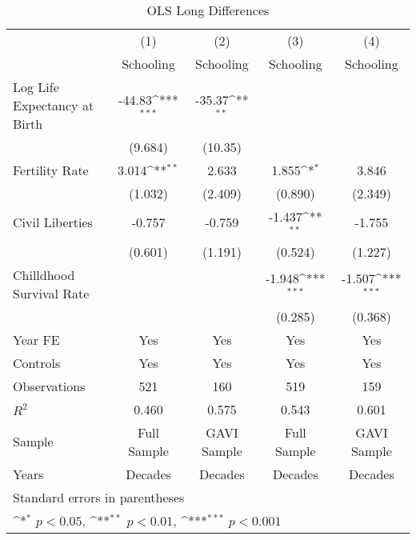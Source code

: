 \begin{table}[htbp]\centering
\def\sym#1{\ifmmode^{#1}\else\(^{#1}\)\fi}
\caption{OLS Long Differences}
\begin{tabular}{l*{4}{c}}
\toprule
                &\multicolumn{1}{c}{(1)}&\multicolumn{1}{c}{(2)}&\multicolumn{1}{c}{(3)}&\multicolumn{1}{c}{(4)}\\
                &\multicolumn{1}{c}{Schooling}&\multicolumn{1}{c}{Schooling}&\multicolumn{1}{c}{Schooling}&\multicolumn{1}{c}{Schooling}\\
\midrule
Log Life Expectancy at Birth&   -44.83\sym{***}&   -35.37\sym{**} &                  &                  \\
                &  (9.684)         &  (10.35)         &                  &                  \\
\addlinespace
Fertility Rate  &    3.014\sym{**} &    2.633         &    1.855\sym{*}  &    3.846         \\
                &  (1.032)         &  (2.409)         &  (0.890)         &  (2.349)         \\
\addlinespace
Civil Liberties &   -0.757         &   -0.759         &   -1.437\sym{**} &   -1.755         \\
                &  (0.601)         &  (1.191)         &  (0.524)         &  (1.227)         \\
\addlinespace
Chilldhood Survival Rate&                  &                  &   -1.948\sym{***}&   -1.507\sym{***}\\
                &                  &                  &  (0.285)         &  (0.368)         \\
\addlinespace
Year FE         &      Yes         &      Yes         &      Yes         &      Yes         \\
\addlinespace
Controls        &      Yes         &      Yes         &      Yes         &      Yes         \\
\midrule
Observations    &      521         &      160         &      519         &      159         \\
\(R^{2}\)       &    0.460         &    0.575         &    0.543         &    0.601         \\
Sample          &Full Sample         &GAVI Sample         &Full Sample         &GAVI Sample         \\
Years           &  Decades         &  Decades         &  Decades         &  Decades         \\
\bottomrule
\multicolumn{5}{l}{\footnotesize Standard errors in parentheses}\\
\multicolumn{5}{l}{\footnotesize \sym{*} \(p<0.05\), \sym{**} \(p<0.01\), \sym{***} \(p<0.001\)}\\
\end{tabular}
\end{table}
